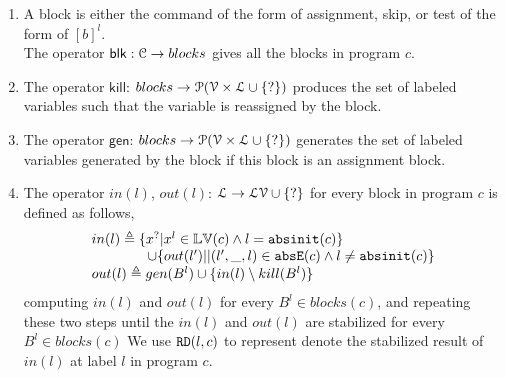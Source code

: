 \begin{enumerate}
\item 

A block is either the command of the form of assignment, skip, or test of the form of $[b]^{l}$.\\
The operator $\mathsf{blk}: \mathcal{C} \to blocks$ gives all the blocks in program $c$.
\item The operator $\mathsf{kill}$: $blocks \to \mathcal{P}(\mathcal{V} \times \mathcal{L} \cup \{?\})$ produces the set of labeled variables such that the variable is reassigned by the block.
\item The operator $\mathsf{gen}$: $blocks \to \mathcal{P}(\mathcal{V} \times \mathcal{L} \cup \{?\})$ generates the set of labeled variables generated by the block if this block is an assignment block.
\item The operator $in(l)$, $out(l)$: $ \mathcal{L} \to \mathcal{LV} \cup \{?\}$ for every block in program $c$ is defined as follows,
 \[
 \begin{array}{ll}
 in(l) \triangleq \{ x^{?} | x^l \in \mathbb{LV}(c) \land l = \mathtt{abs}{\mathtt{init}}(c) \} 
 \\ \qquad \qquad \cup \{ out(l')| | (l',\_, l) \in \mathtt{abs}{\mathtt{E}}(c) \land l \neq \mathtt{abs}{\mathtt{init}}(c)\} \\
 out(l) \triangleq gen(B^{l}) \cup \{ in(l) \setminus kill(B^l) \} 
 \end{array}
 \]
computing $in(l)$ and $out(l)$ for every $B^l \in blocks(c) $, and repeating these two steps
until the $in(l)$ and $out(l)$ are stabilized for every $B^l \in blocks(c) $
We use $\mathtt{RD}(l,c)$ to represent 
denote the stabilized result of $in(l)$ at label $l$ in program $c$. 

\end{enumerate}
